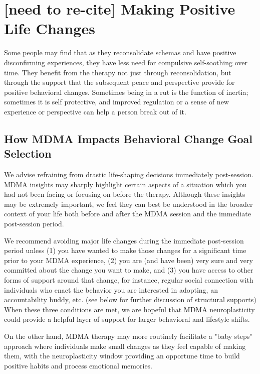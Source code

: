 \documentclass[12pt,letterpaper]{book}
\begin{document}
\section{[need to re-cite] Making Positive Life Changes}
\label{sec:behavioralchange}
Some people may find that as they reconsolidate schemas and have positive disconfirming experiences, they have less need for compulsive self-soothing over time. They benefit from the therapy not just through reconsolidation, but through the support that the subsequent peace and perspective provide for positive behavioral changes. Sometimes being in a rut is the function of inertia; sometimes it is self protective, and improved regulation or a sense of new experience or perspective can help a person break out of it.

\subsection*{How MDMA Impacts Behavioral Change Goal Selection}

We advise refraining from drastic life-shaping decisions immediately post-session. MDMA insights may sharply highlight certain aspects of a situation which you had not been facing or focusing on before the therapy. Although these insights may be extremely important, we feel they can best be understood in the broader context of your life both before and after the MDMA session and the immediate post-session period.

We recommend avoiding major life changes during the immediate post-session period unless (1) you have wanted to make those changes for a significant time prior to your MDMA experience, (2) you are (and have been) very sure and very committed about the change you want to make, and (3) you have access to other forms of support around that change, for instance, regular social connection with individuals who enact the behavior you are interested in adopting, an accountability buddy, etc. (see below for further discussion of structural supports) When these three conditions are met, we are hopeful that MDMA neuroplasticity could provide a helpful layer of support for larger behavioral and lifestyle shifts.

On the other hand, MDMA therapy may more routinely facilitate a "baby steps" approach where individuals make small changes as they feel capable of making them, with the neuroplasticity window providing an opportune time to build positive habits and process emotional memories.
\end{document}
